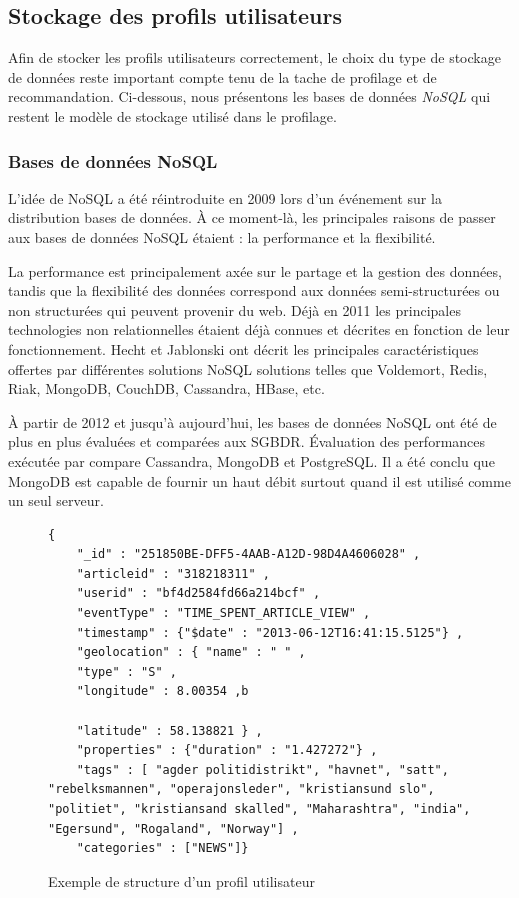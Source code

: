 \subsection{Stockage des profils utilisateurs}
Afin de stocker les profils utilisateurs correctement, le choix du type de stockage de données reste important compte tenu de la tache de profilage et de recommandation. Ci-dessous, nous présentons les bases de données \emph{NoSQL} qui restent le modèle de stockage utilisé dans le profilage.  

\subsubsection{Bases de données NoSQL}\label{nosql-ss}
L'idée de NoSQL a été réintroduite en 2009 lors d'un événement sur la distribution bases de données. À ce moment-là, les principales raisons de passer aux bases de données NoSQL étaient : la performance et la flexibilité. 

La performance est principalement axée sur le partage et la gestion des données, tandis que la flexibilité des données correspond aux données semi-structurées ou non structurées qui peuvent provenir du web. Déjà en 2011 les principales technologies non relationnelles étaient déjà connues et décrites en fonction de leur fonctionnement. Hecht et Jablonski \cite{NOSQL1} ont décrit les principales caractéristiques offertes par différentes solutions NoSQL solutions telles que Voldemort, Redis, Riak, MongoDB, CouchDB, Cassandra, HBase, etc.

À partir de 2012 et jusqu'à aujourd'hui, les bases de données NoSQL ont été de plus en plus évaluées et comparées aux SGBDR. Évaluation des performances exécutée par \cite{NOSQL2} compare Cassandra, MongoDB et PostgreSQL. Il a été conclu que MongoDB est capable de fournir un haut débit surtout quand il est utilisé comme un seul serveur.

\begin{figure}[H]
    \begin{lstlisting}[style=code]
    {
    "_id" : "251850BE-DFF5-4AAB-A12D-98D4A4606028" ,
    "articleid" : "318218311" ,
    "userid" : "bf4d2584fd66a214bcf" ,
    "eventType" : "TIME_SPENT_ARTICLE_VIEW" ,
    "timestamp" : {"$date" : "2013-06-12T16:41:15.5125"} ,
    "geolocation" : { "name" : " " ,
    "type" : "S" ,
    "longitude" : 8.00354 ,b
    
    "latitude" : 58.138821 } ,
    "properties" : {"duration" : "1.427272"} ,
    "tags" : [ "agder politidistrikt", "havnet", "satt", "rebelksmannen", "operajonsleder", "kristiansund slo", "politiet", "kristiansand skalled", "Maharashtra", "india", "Egersund", "Rogaland", "Norway"] ,
    "categories" : ["NEWS"]}
    \end{lstlisting}
    \caption{Exemple de structure d'un profil utilisateur \cite{refnorvege}}
\end{figure}

